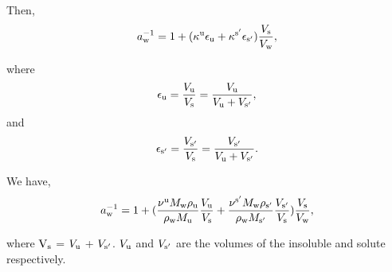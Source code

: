 \documentclass[12pt]{article}
\begin{document}
Then,
\begin{equation}\label{eqn:A2}
a_{\rm w}^{-1}=1+ (\kappa^{\rm u} \epsilon_{\rm u} +\kappa^{\rm s'} \epsilon_{\rm s'}) \frac{V_{\rm s}}{V_{\rm w}},
\end{equation}

where
\begin{equation}\label{eqn:A3}
\epsilon_{\rm u}=\frac{V_{\rm u}}{V_{\rm s}}=\frac{V_{\rm u}}{V_{\rm u}+V_{\rm s'}},
\end{equation}
and
\begin{equation}\label{eqn:A4}
\epsilon_{\rm s'}=\frac{V_{\rm s'}}{V_{\rm s}}=\frac{V_{\rm s'}}{V_{\rm u}+V_{\rm s'}}.
\end{equation}

We have,
\begin{equation}\label{eqn:A5}
a_{\rm w}^{-1}=1+ (  \frac{\nu^{\rm u} M_{\rm w} \rho_{\rm u}}{\rho_{\rm w}M_{\rm u}} 
\frac{V_{\rm u}}{V_{\rm s}} +
\frac{\nu^{\rm s'} M_{\rm w} \rho_{\rm s'}}{\rho_{\rm w} M_{\rm s'}}    
\frac{V_{\rm s'}}{V_{\rm s}})
\frac{V_{\rm s}}{V_{\rm w}},
\end{equation}

where $\rm V_{\rm s}$ = $ V_{\rm u}$ + $V_{\rm s'}$. $V_{\rm u}$ and $V_{\rm s'}$ are the volumes of the insoluble and solute respectively.
\end{document}
